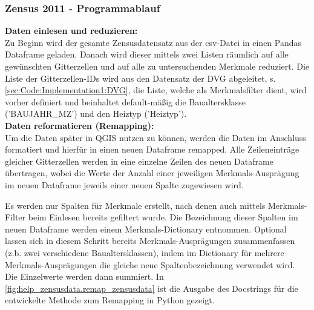 			\subsubsection{Zensus 2011 - Programmablauf}
				\textbf{Daten einlesen und reduzieren:}\\
				Zu Beginn wird der gesamte Zensusdatensatz aus der csv-Datei in einen Pandas Dataframe geladen. Danach wird dieser mittels zwei Listen räumlich auf alle gewünschten Gitterzellen und auf alle zu untersuchenden Merkmale reduziert. Die Liste der Gitterzellen-IDs wird aus den Datensatz der DVG abgeleitet, s. \autoref{sec:Code:Implementation1:DVG}, die Liste, welche als Merkmalsfilter dient, wird vorher definiert und beinhaltet default-mäßig die Baualtersklasse ('BAUJAHR\_MZ') und den Heiztyp ('Heiztyp').  \\
				
				
				\textbf{Daten reformatieren (Remapping):}\\
				Um die Daten später in QGIS nutzen zu können, werden die Daten im Anschluss formatiert und hierfür in einen neuen Dataframe remapped. Alle Zeileneinträge gleicher Gitterzellen werden in eine einzelne Zeilen des neuen Dataframe übertragen, wobei die Werte der Anzahl einer jeweiligen Merkmals-Ausprägung im neuen Dataframe jeweils einer neuen Spalte zugewiesen wird. 
				
				Es werden nur Spalten für Merkmale erstellt, nach denen auch mittels Merkmals-Filter beim Einlesen bereits gefiltert wurde. Die Bezeichnung dieser Spalten im neuen Dataframe werden einem Merkmals-Dictionary entnommen. Optional lassen sich in diesem Schritt bereits Merkmals-Ausprägungen zusammenfassen (z.b. zwei verschiedene Baualtersklassen), indem im Dictionary für mehrere Merkmals-Ausprägungen die gleiche neue Spaltenbezeichnung verwendet wird. Die Einzelwerte werden dann summiert. In \autoref{fig:help_zensusdata.remap_zensusdata} ist die Ausgabe des Docstrings für die entwickelte Methode zum Remapping in Python gezeigt. \\
				
							
